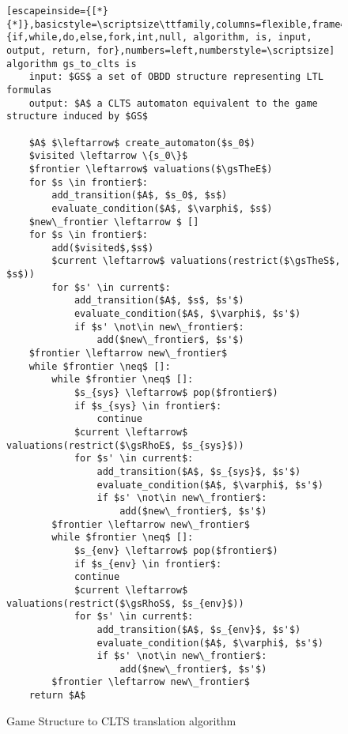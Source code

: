 \renewcommand{\ttdefault}{pcr}
\begin{figure}[bt]
\begin{lstlisting}[escapeinside={[*}{*]},basicstyle=\scriptsize\ttfamily,columns=flexible,frame=lines,mathescape=true,xleftmargin=3.0ex,keywordstyle=\textbf,morekeywords={if,while,do,else,fork,int,null, algorithm, is, input, output, return, for},numbers=left,numberstyle=\scriptsize]
algorithm gs_to_clts is
	input: $GS$ a set of OBDD structure representing LTL formulas
	output: $A$ a CLTS automaton equivalent to the game structure induced by $GS$
	
	$A$ $\leftarrow$ create_automaton($s_0$)
	$visited \leftarrow \{s_0\}$ 
	$frontier \leftarrow$ valuations($\gsTheE$)
	for $s \in frontier$:
		add_transition($A$, $s_0$, $s$)
		evaluate_condition($A$, $\varphi$, $s$)		
	$new\_frontier \leftarrow $ [] 
	for $s \in frontier$:
		add($visited$,$s$)
		$current \leftarrow$ valuations(restrict($\gsTheS$, $s$))
		for $s' \in current$:
			add_transition($A$, $s$, $s'$)
			evaluate_condition($A$, $\varphi$, $s'$)
			if $s' \not\in new\_frontier$:			
				add($new\_frontier$, $s'$)
	$frontier \leftarrow new\_frontier$
	while $frontier \neq$ []:
		while $frontier \neq$ []:		
			$s_{sys} \leftarrow$ pop($frontier$)
			if $s_{sys} \in frontier$:
				continue
			$current \leftarrow$ valuations(restrict($\gsRhoE$, $s_{sys}$))
			for $s' \in current$:
				add_transition($A$, $s_{sys}$, $s'$)
				evaluate_condition($A$, $\varphi$, $s'$)			
				if $s' \not\in new\_frontier$:			
					add($new\_frontier$, $s'$)				
		$frontier \leftarrow new\_frontier$		
		while $frontier \neq$ []:		
			$s_{env} \leftarrow$ pop($frontier$)
			if $s_{env} \in frontier$:
			continue
			$current \leftarrow$ valuations(restrict($\gsRhoS$, $s_{env}$))
			for $s' \in current$:
				add_transition($A$, $s_{env}$, $s'$)
				evaluate_condition($A$, $\varphi$, $s'$)			
				if $s' \not\in new\_frontier$:			
					add($new\_frontier$, $s'$)				
		$frontier \leftarrow new\_frontier$				
	return $A$
\end{lstlisting}
\caption{Game Structure to CLTS translation algorithm}
\label{fig:gs_to_clts_algorithm}
\MediumPicture
\end{figure}
